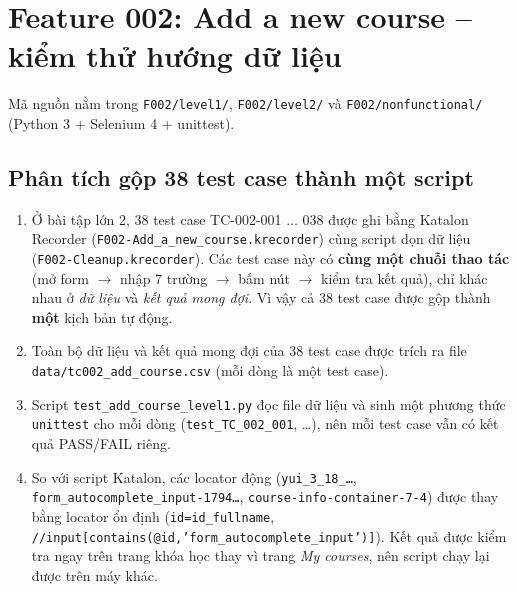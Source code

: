 \section{Feature 002: Add a new course -- kiểm thử hướng dữ liệu}
Mã nguồn nằm trong \texttt{F002/level1/}, \texttt{F002/level2/} và \texttt{F002/nonfunctional/} (Python 3 + Selenium 4 + unittest).

\subsection{Phân tích gộp 38 test case thành một script}
\begin{enumerate}[noitemsep]
  \item Ở bài tập lớn 2, 38 test case TC-002-001 $\dots$ 038 được ghi bằng Katalon Recorder (\texttt{F002-Add\_a\_new\_course.krecorder})
        cùng script dọn dữ liệu (\texttt{F002-Cleanup.krecorder}). Các test case này có \textbf{cùng một chuỗi thao tác} (mở form
        $\rightarrow$ nhập 7 trường $\rightarrow$ bấm nút $\rightarrow$ kiểm tra kết quả), chỉ khác nhau ở \emph{dữ liệu} và
        \emph{kết quả mong đợi}. Vì vậy cả 38 test case được gộp thành \textbf{một} kịch bản tự động.
  \item Toàn bộ dữ liệu và kết quả mong đợi của 38 test case được trích ra file \texttt{data/tc002\_add\_course.csv} (mỗi dòng là một test case).
  \item Script \texttt{test\_add\_course\_level1.py} đọc file dữ liệu và sinh một phương thức \texttt{unittest} cho mỗi dòng
        (\texttt{test\_TC\_002\_001}, \dots), nên mỗi test case vẫn có kết quả PASS/FAIL riêng.
  \item So với script Katalon, các locator động (\texttt{yui\_3\_18\_\dots}, \texttt{form\_autocomplete\_input-1794\dots},
        \texttt{course-info-container-7-4}) được thay bằng locator ổn định (\texttt{id=id\_fullname},
        \texttt{//input[contains(@id,'form\_autocomplete\_input')]}). Kết quả được kiểm tra ngay trên trang khóa học
        thay vì trang \textit{My courses}, nên script chạy lại được trên máy khác.
\end{enumerate}

